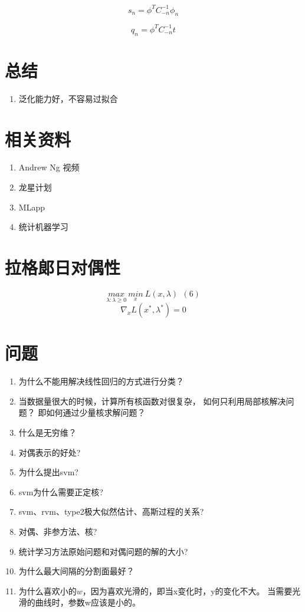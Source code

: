 \begin{equation}
s_n = \phi^TC_{-n}^{-1}\phi_n
\end{equation}

\begin{equation}
q_n = \phi^TC_{-n}^{-1}t
\end{equation}

\section{总结}
\begin{enumerate}
\item 泛化能力好，不容易过拟合
\cite{longxing2012machinelearning}
\end{enumerate}
\section{相关资料}
\begin{enumerate}
\item Andrew Ng 视频
\item 龙星计划
\item MLapp
\item 统计机器学习
\end{enumerate}

\section{拉格郞日对偶性}

\begin{equation}
\underset{\lambda:\lambda\geq 0}{max}\ \underset{x}{min}\ L(x, \lambda) \ \ (6)
\end{equation}
\begin{equation}
\nabla_xL(x^*, \lambda^*) = 0
\end{equation}
\section{问题}
\begin{enumerate}
\item 为什么不能用解决线性回归的方式进行分类？
\item 当数据量很大的时候，计算所有核函数对很复杂，
如何只利用局部核解决问题？ 即如何通过少量核求解问题？
\item 什么是无穷维？
\item 对偶表示的好处?
\item 为什么提出svm?
\item svm为什么需要正定核?
\item svm、rvm、type2极大似然估计、高斯过程的关系?
\item 对偶、非参方法、核?
\item 统计学习方法原始问题和对偶问题的解的大小?
\item 为什么最大间隔的分割面最好？
\item 为什么喜欢小的$w$，因为喜欢光滑的，即当x变化时，y的变化不大。
当需要光滑的曲线时，参数w应该是小的。
\end{enumerate}



